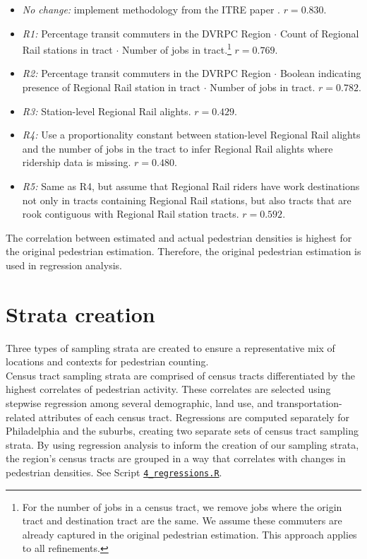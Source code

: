 \documentclass[paper=letterpaper, fontsize=11pt]{scrartcl}
\begin{document}
\begin{itemize}[itemsep=-4pt]
	\item \textit{No change:} implement methodology from the ITRE paper \cite{ncstate}. $r = 0.830$.
	\item \textit{R1:} Percentage transit commuters in the DVRPC Region $\cdot$ Count of Regional Rail stations in tract $\cdot$ Number of jobs in tract.\footnote{For the number of jobs in a census tract, we remove jobs where the origin tract and destination tract are the same. We assume these commuters are already captured in the original pedestrian estimation. This approach applies to all refinements.} $r = 0.769$.
	\item \textit{R2:} Percentage transit commuters in the DVRPC Region $\cdot$ Boolean indicating presence of Regional Rail station in tract $\cdot$ Number of jobs in tract. $ r =0.782$.
	\item \textit{R3:} Station-level Regional Rail alights. $r = 0.429$.
	\item \textit{R4:} Use a proportionality constant between station-level Regional Rail alights and the number of jobs in the tract to infer Regional Rail alights where ridership data is missing. $r = 0.480$.
	\item \textit{R5:} Same as R4, but assume that Regional Rail riders have work destinations not only in tracts containing Regional Rail stations, but also tracts that are rook contiguous with Regional Rail station tracts. $r = 0.592$.
\end{itemize}

The correlation between estimated and actual pedestrian densities is highest for the original pedestrian estimation. Therefore, the original pedestrian estimation is used in regression analysis.

\section{Strata creation}
\label{sec:create-strata}
Three types of sampling strata are created to ensure a representative mix of locations and contexts for pedestrian counting. \\

Census tract sampling strata are comprised of census tracts differentiated by the highest correlates of pedestrian activity. These correlates are selected using stepwise regression among several demographic, land use, and transportation-related attributes of each census tract. Regressions are computed separately for Philadelphia and the suburbs, creating two separate sets of census tract sampling strata. By using regression analysis to inform the creation of our sampling strata, the region's census tracts are grouped in a way that correlates with changes in pedestrian densities. See Script \href{https://github.com/addisonlarson/ped_counts/blob/master/4_regressions.R}{\texttt{4\_regressions.R}}. \\
\end{document}
